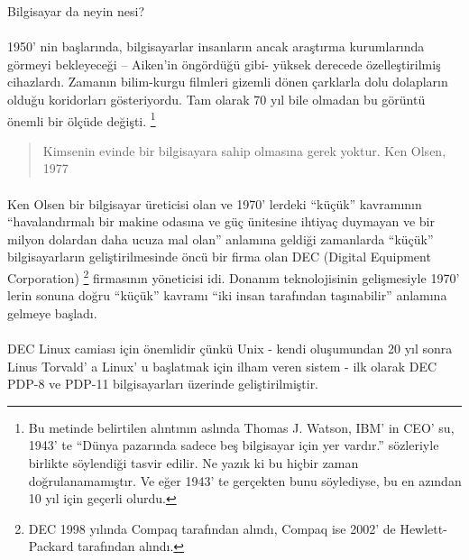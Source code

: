 \documentclass[10pt,a5paper]{book}
\begin{document}
\begin{section}{Bilgisayar da neyin nesi?}
\paragraph{}{1950' nin başlarında, bilgisayarlar insanların ancak araştırma kurumlarında görmeyi bekleyeceği – Aiken'in öngördüğü gibi- yüksek derecede özelleştirilmiş cihazlardı. Zamanın bilim-kurgu filmleri gizemli dönen çarklarla dolu dolapların olduğu koridorları gösteriyordu. Tam olarak 70 yıl bile olmadan bu görüntü önemli bir ölçüde değişti. 
\footnote{Bu metinde belirtilen alıntının aslında Thomas J. Watson, IBM' in CEO' su, 1943' te “Dünya pazarında sadece beş bilgisayar için yer vardır.” sözleriyle birlikte söylendiği tasvir edilir. Ne yazık ki bu hiçbir zaman doğrulanamamıştır. Ve eğer 1943' te gerçekten bunu söylediyse, bu en azından 10 yıl için geçerli olurdu.}}
\begin{quotation}{Kimsenin evinde bir bilgisayara sahip olmasına gerek yoktur. Ken Olsen, 1977}
\end{quotation}
\paragraph{}{Ken Olsen bir bilgisayar üreticisi olan ve 1970' lerdeki “küçük” kavramının “havalandırmalı bir makine odasına ve güç ünitesine ihtiyaç duymayan ve bir milyon dolardan daha ucuza mal olan” anlamına geldiği zamanlarda “küçük” bilgisayarların geliştirilmesinde öncü bir firma olan  DEC (Digital Equipment Corporation) \footnote{DEC 1998 yılında Compaq tarafından alındı, Compaq ise 2002' de Hewlett-Packard tarafından alındı.} firmasının yöneticisi idi. Donanım teknolojisinin gelişmesiyle 1970' lerin sonuna doğru “küçük” kavramı “iki insan tarafından taşınabilir” anlamına gelmeye başladı.}
\paragraph{}{DEC Linux camiası için önemlidir çünkü Unix - kendi oluşumundan 20 yıl sonra Linus Torvald' a Linux' u başlatmak için ilham veren sistem - ilk olarak DEC PDP-8 ve PDP-11 bilgisayarları üzerinde geliştirilmiştir.}

\end{section}
\end{document}
